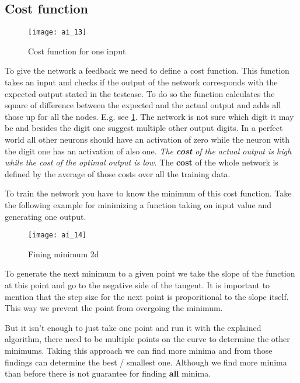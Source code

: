 \documentclass{article}
\begin{document}

\subsection{Cost function}

\begin{figure}[!htbp]
	\centering
	\texttt{[image: ai\_13]}
	\caption{Cost function for one input}
	\label{ai_13}
\end{figure}

To give the network a feedback we need to define a cost function. This function takes an input and checks if the output of the network corresponds with the expected output stated in the testcase. To do so the function calculates the square of difference between the expected and the actual output and adds all those up for all the nodes. E.g. see \ref{ai_13}. The network is not sure which digit it may be and besides the digit one suggest multiple other output digits. In a perfect world all other neurons should have an activation of zero while the neuron with the digit one has an activation of also one. \textit{The \textbf{cost} of the actual output is high while the cost of the optimal output is low.} The \textbf{cost} of the whole network is defined by the average of those costs over all the training data.


To train the network you have to know the minimum of this cost function. Take the following example for minimizing a function taking on input value and generating one output. 

\begin{figure}[!htbp]
	\centering
	\texttt{[image: ai\_14]}
	\caption{Fining minimum 2d}
	\label{ai_14}
\end{figure}

To generate the next minimum to a given point we take the slope of the function at this point and go to the negative side of the tangent. It is important to mention that the step size for the next point is proporitional to the slope itself. This way we prevent the point from overgoing the minimum. 

But it isn't enough to just take one point and run it with the explained algorithm, there need to be multiple points on the curve to determine the other minimums. Taking this approach we can find more minima and from those findings can determine the best / smallest one. Although we find more minima than before there is not guarantee for finding \textbf{all} minima.
\end{document}

